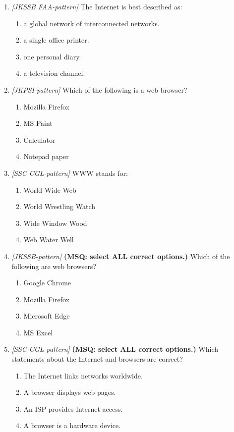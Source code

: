 \documentclass[11pt]{article}
\begin{document}
\begin{enumerate}[label=\textbf{Q\arabic*.}, leftmargin=*]
\item \textit{[JKSSB FAA-pattern]} The Internet is best described as:
  \begin{enumerate}[label=\Alph*.]
    \item a global network of interconnected networks.
    \item a single office printer.
    \item one personal diary.
    \item a television channel.
  \end{enumerate}
\item \textit{[JKPSI-pattern]} Which of the following is a web browser?
  \begin{enumerate}[label=\Alph*.]
    \item Mozilla Firefox
    \item MS Paint
    \item Calculator
    \item Notepad paper
  \end{enumerate}
\item \textit{[SSC CGL-pattern]} WWW stands for:
  \begin{enumerate}[label=\Alph*.]
    \item World Wide Web
    \item World Wrestling Watch
    \item Wide Window Wood
    \item Web Water Well
  \end{enumerate}
\item \textit{[JKSSB-pattern]} \textbf{(MSQ: select ALL correct options.)} Which of the following are web browsers?
  \begin{enumerate}[label=\Alph*.]
    \item Google Chrome
    \item Mozilla Firefox
    \item Microsoft Edge
    \item MS Excel
  \end{enumerate}
\item \textit{[SSC CGL-pattern]} \textbf{(MSQ: select ALL correct options.)} Which statements about the Internet and browsers are correct?
  \begin{enumerate}[label=\Alph*.]
    \item The Internet links networks worldwide.
    \item A browser displays web pages.
    \item An ISP provides Internet access.
    \item A browser is a hardware device.
  \end{enumerate}
\end{enumerate}
\def\JKSSBLessonID{34}\def\JKSSBAnswers{0}
\end{document}
